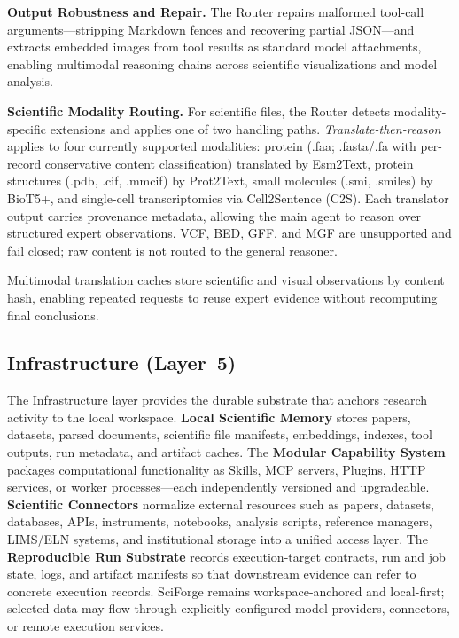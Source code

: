 \documentclass[sn-basic,Numbered,pdflatex]{sn-jnl}
\begin{document}
\textbf{Output Robustness and Repair.} The Router repairs malformed tool-call arguments---stripping Markdown fences and recovering partial JSON---and extracts embedded images from tool results as standard model attachments, enabling multimodal reasoning chains across scientific visualizations and model analysis.

\textbf{Scientific Modality Routing.} For scientific files, the Router detects modality-specific extensions and applies one of two handling paths. \emph{Translate-then-reason} applies to four currently supported modalities: protein (.faa; .fasta/.fa with per-record conservative content classification) translated by Esm2Text, protein structures (.pdb, .cif, .mmcif) by Prot2Text, small molecules (.smi, .smiles) by BioT5+, and single-cell transcriptomics via Cell2Sentence (C2S). Each translator output carries provenance metadata, allowing the main agent to reason over structured expert observations. VCF, BED, GFF, and MGF are unsupported and fail closed; raw content is not routed to the general reasoner.

Multimodal translation caches store scientific and visual observations by content hash, enabling repeated requests to reuse expert evidence without recomputing final conclusions.


\subsection{Infrastructure (Layer~5)}
The Infrastructure layer provides the durable substrate that anchors research activity to the local workspace. \textbf{Local Scientific Memory} stores papers, datasets, parsed documents, scientific file manifests, embeddings, indexes, tool outputs, run metadata, and artifact caches. The \textbf{Modular Capability System} packages computational functionality as Skills, MCP servers, Plugins, HTTP services, or worker processes---each independently versioned and upgradeable. \textbf{Scientific Connectors} normalize external resources such as papers, datasets, databases, APIs, instruments, notebooks, analysis scripts, reference managers, LIMS/ELN systems, and institutional storage into a unified access layer. The \textbf{Reproducible Run Substrate} records execution-target contracts, run and job state, logs, and artifact manifests so that downstream evidence can refer to concrete execution records. SciForge remains workspace-anchored and local-first; selected data may flow through explicitly configured model providers, connectors, or remote execution services.
\end{document}
